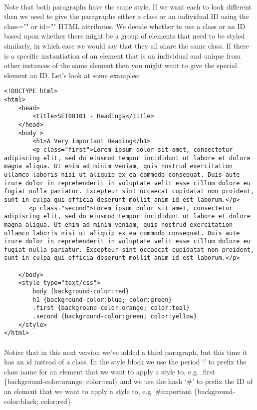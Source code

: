 \documentclass[10pt, a4paper]{article}
\begin{document}
\paragraph{} Note that both paragraphs have the same style. If we want each to look different then we need to give the paragraphs either a class or an individual ID using the class="" or id="" HTML attributes. We decide whether to use a class or an ID based upon whether there might be a group of elements that need to be styled similarly, in which case we would say that they all share the same class. If there is a specific instantiation of an element that is an individual and unique from other instances of the same element then you might want to give the special element an ID. Let's look at some examples:

\begin{lstlisting}
<!DOCTYPE html>
<html>
    <head>
        <title>SET08101 - Headings</title>
    </head>
    <body >
        <h1>A Very Important Heading</h1>
        <p class="first">Lorem ipsum dolor sit amet, consectetur adipiscing elit, sed do eiusmod tempor incididunt ut labore et dolore magna aliqua. Ut enim ad minim veniam, quis nostrud exercitation ullamco laboris nisi ut aliquip ex ea commodo consequat. Duis aute irure dolor in reprehenderit in voluptate velit esse cillum dolore eu fugiat nulla pariatur. Excepteur sint occaecat cupidatat non proident, sunt in culpa qui officia deserunt mollit anim id est laborum.</p>
       <p class="second">Lorem ipsum dolor sit amet, consectetur adipiscing elit, sed do eiusmod tempor incididunt ut labore et dolore magna aliqua. Ut enim ad minim veniam, quis nostrud exercitation ullamco laboris nisi ut aliquip ex ea commodo consequat. Duis aute irure dolor in reprehenderit in voluptate velit esse cillum dolore eu fugiat nulla pariatur. Excepteur sint occaecat cupidatat non proident, sunt in culpa qui officia deserunt mollit anim id est laborum.</p>

    </body>
    <style type="text/css">
        body {background-color:red}
        h1 {background-color:blue; color:green}
        .first {background-color:orange; color:teal}
        .second {background-color:green; color:yellow}
    </style>
</html>
\end{lstlisting}

\paragraph{} Notice that in this next version we've added a third paragraph, but this time it has an id instead of a class. In the style block we use the period `.' to prefix the class name for an element that we want to apply a style to, e.g. .first \{background-color:orange; color:teal\} and we use the hash `\#' to prefix the ID of an element that we want to apply a style to, e.g. \#important \{background-color:black; color:red\}
\end{document}
